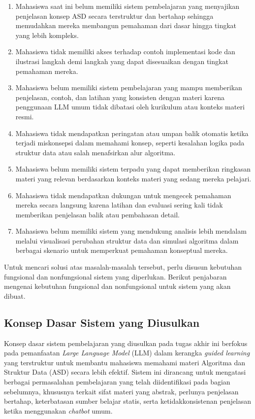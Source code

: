 \begin{enumerate}
    \item Mahasiswa saat ini belum memiliki sistem pembelajaran yang menyajikan penjelasan konsep ASD secara terstruktur dan bertahap sehingga memudahkan mereka membangun pemahaman dari dasar hingga tingkat yang lebih kompleks.

    \item Mahasiswa tidak memiliki akses terhadap contoh implementasi kode dan ilustrasi langkah demi langkah yang dapat disesuaikan dengan tingkat pemahaman mereka.

    \item Mahasiswa belum memiliki sistem pembelajaran yang mampu memberikan penjelasan, contoh, dan latihan yang konsisten dengan materi karena penggunaan LLM umum tidak dibatasi oleh kurikulum atau konteks materi resmi.

    \item Mahasiswa tidak mendapatkan peringatan atau umpan balik otomatis ketika terjadi miskonsepsi dalam memahami konsep, seperti kesalahan logika pada struktur data atau salah menafsirkan alur algoritma.

    \item Mahasiswa belum memiliki sistem terpadu yang dapat memberikan ringkasan materi yang relevan berdasarkan konteks materi yang sedang mereka pelajari.

    \item Mahasiswa tidak mendapatkan dukungan untuk mengecek pemahaman mereka secara langsung karena latihan dan evaluasi sering kali tidak memberikan penjelasan balik atau pembahasan detail.

    \item Mahasiswa belum memiliki sistem yang mendukung analisis lebih mendalam melalui visualisasi perubahan struktur data dan simulasi algoritma dalam berbagai skenario untuk memperkuat pemahaman konseptual mereka.
\end{enumerate}

Untuk mencari solusi atas masalah-masalah tersebut, perlu disusun kebutuhan fungsional dan nonfungsional sistem yang diperlukan. Berikut penjabaran mengenai kebutuhan fungsional dan nonfungsional untuk sistem yang akan dibuat.

\subsection{Konsep Dasar Sistem yang Diusulkan}

Konsep dasar sistem pembelajaran yang diusulkan pada tugas akhir ini berfokus pada pemanfaatan \textit{Large Language Model} (LLM) dalam kerangka \textit{guided learning} yang terstruktur untuk membantu mahasiswa memahami materi Algoritma dan Struktur Data (ASD) secara lebih efektif. Sistem ini dirancang untuk mengatasi berbagai permasalahan pembelajaran yang telah diidentifikasi pada bagian sebelumnya, khususnya terkait sifat materi yang abstrak, perlunya penjelasan bertahap, keterbatasan sumber belajar statis, serta ketidakkonsistenan penjelasan ketika menggunakan \textit{chatbot} umum.


